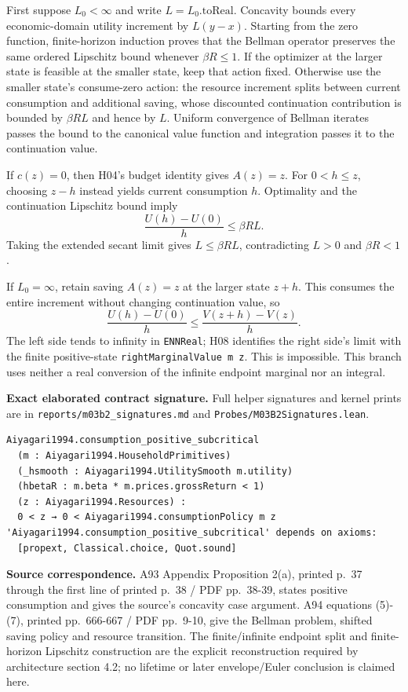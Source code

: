 \documentclass[
  11pt,
]{article}
\let\LedgerOriginalTexttt\texttt
\renewcommand{\texttt}[1]{{\small\LedgerOriginalTexttt{#1}}}
\begin{document}
First suppose \(L_0<\infty\) and write \(L=L_0.\mathrm{toReal}\).
Concavity bounds every economic-domain utility increment by \(L(y-x)\).
Starting from the zero function, finite-horizon induction proves that
the Bellman operator preserves the same ordered Lipschitz bound whenever
\(\beta R\leq1\). If the optimizer at the larger state is feasible at
the smaller state, keep that action fixed. Otherwise use the smaller
state's consume-zero action: the resource increment splits between
current consumption and additional saving, whose discounted continuation
contribution is bounded by \(\beta R L\) and hence by \(L\). Uniform
convergence of Bellman iterates passes the bound to the canonical value
function and integration passes it to the continuation value.

If \(c(z)=0\), then H04's budget identity gives \(A(z)=z\). For
\(0<h\leq z\), choosing \(z-h\) instead yields current consumption
\(h\). Optimality and the continuation Lipschitz bound imply \[
 \frac{U(h)-U(0)}h\leq\beta R L.
\] Taking the extended secant limit gives \(L\leq\beta R L\),
contradicting \(L>0\) and \(\beta R<1\).

If \(L_0=\infty\), retain saving \(A(z)=z\) at the larger state \(z+h\).
This consumes the entire increment without changing continuation value,
so \[
 \frac{U(h)-U(0)}h\leq\frac{V(z+h)-V(z)}h.
\] The left side tends to infinity in \texttt{ENNReal}; H08 identifies
the right side's limit with the finite positive-state
\texttt{rightMarginalValue\ m\ z}. This is impossible. This branch uses
neither a real conversion of the infinite endpoint marginal nor an
integral.

\textbf{Exact elaborated contract signature.} Full helper signatures and
kernel prints are in \texttt{reports/m03b2\_signatures.md} and
\texttt{Probes/M03B2Signatures.lean}.

\begin{verbatim}
Aiyagari1994.consumption_positive_subcritical
  (m : Aiyagari1994.HouseholdPrimitives)
  (_hsmooth : Aiyagari1994.UtilitySmooth m.utility)
  (hbetaR : m.beta * m.prices.grossReturn < 1)
  (z : Aiyagari1994.Resources) :
  0 < z → 0 < Aiyagari1994.consumptionPolicy m z
'Aiyagari1994.consumption_positive_subcritical' depends on axioms:
  [propext, Classical.choice, Quot.sound]
\end{verbatim}

\textbf{Source correspondence.} A93 Appendix Proposition 2(a), printed
p.~37 through the first line of printed p.~38 / PDF pp.~38-39, states
positive consumption and gives the source's concavity case argument. A94
equations (5)-(7), printed pp.~666-667 / PDF pp.~9-10, give the Bellman
problem, shifted saving policy and resource transition. The
finite/infinite endpoint split and finite-horizon Lipschitz construction
are the explicit reconstruction required by architecture section 4.2; no
lifetime or later envelope/Euler conclusion is claimed here.
\end{document}

